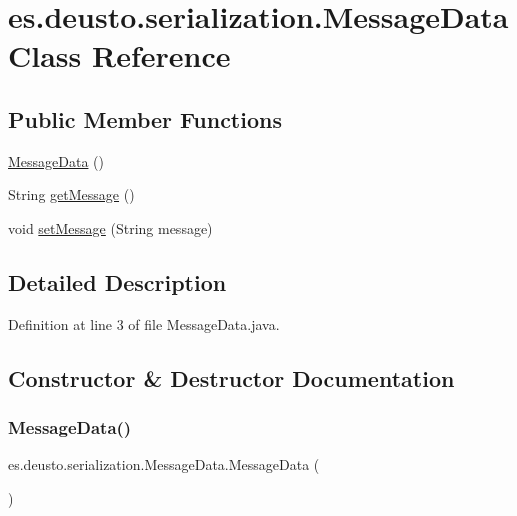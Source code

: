 \hypertarget{classes_1_1deusto_1_1serialization_1_1_message_data}{}\section{es.\+deusto.\+serialization.\+Message\+Data Class Reference}
\label{classes_1_1deusto_1_1serialization_1_1_message_data}
\subsection*{Public Member Functions}
\begin{DoxyCompactItemize}
\item 
\mbox{\hyperlink{classes_1_1deusto_1_1serialization_1_1_message_data_a71a2d4e2380da615e91c6c4aa3d30415}{Message\+Data}} ()
\item 
String \mbox{\hyperlink{classes_1_1deusto_1_1serialization_1_1_message_data_ac44740b717cae3173157c7dbb0bc837e}{get\+Message}} ()
\item 
void \mbox{\hyperlink{classes_1_1deusto_1_1serialization_1_1_message_data_a02ce68ccbf7500a3dfafe4ccf0b728ca}{set\+Message}} (String message)
\end{DoxyCompactItemize}


\subsection{Detailed Description}


Definition at line 3 of file Message\+Data.\+java.



\subsection{Constructor \& Destructor Documentation}
\mbox{\label{classes_1_1deusto_1_1serialization_1_1_message_data_a71a2d4e2380da615e91c6c4aa3d30415}} 
\subsubsection{\texorpdfstring{MessageData()}{MessageData()}}
{\footnotesize\ttfamily es.\+deusto.\+serialization.\+Message\+Data.\+Message\+Data (\begin{DoxyParamCaption}{ }\end{DoxyParamCaption})}



